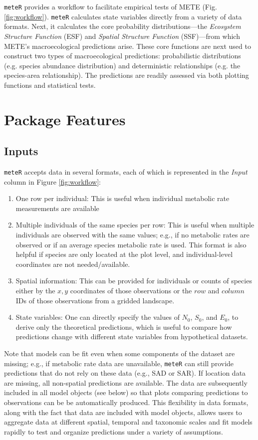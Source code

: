 \texttt{meteR} provides a workflow to facilitate empirical tests of METE
(Fig. \ref{fig:workflow}). \texttt{meteR} calculates state variables
directly from a variety of data formats. Next, it calculates the core
probability distributions---the \textit{Ecosystem Structure Function}
(ESF) and \textit{Spatial Structure Function} (SSF)---from which METE's
macroecological predictions arise. These core functions are next used
to construct two types of macroecological predictions: probabilistic
distributions (e.g. species abundance distribution) and deterministic
relationships (e.g. the species-area relationship). The predictions
are readily assessed via both plotting functions and statistical
tests.

\section{Package Features}

\subsection{Inputs}

\texttt{meteR} accepts data in several formats, each of which is
represented in the \emph{Input} column in Figure \ref{fig:workflow}:
%
\begin{enumerate}
\item One row per individual: This is useful when individual metabolic
  rate measurements are available 
%
\item Multiple individuals of the same species per row: This is useful
  when multiple individuals are observed with the same values; e.g.,
  if no metabolic rates are observed or if an average species
  metabolic rate is used. This format is also helpful if species are
  only located at the plot level, and individual-level coordinates are
  not needed/available.
%
\item Spatial information: This can be provided for individuals or
  counts of species either by the $x, y$ coordinates of those
  observations or the $row$ and $column$ IDs of those observations
  from a gridded landscape.
%
\item State variables: One can directly specify the values of $N_0$,
  $S_0$, and $E_0$, to derive only the theoretical predictions, which
  is useful to compare how predictions change with different state
  variables from hypothetical datasets. 
%
\end{enumerate}

Note that models can be fit even when some components of the dataset
are missing; e.g., if metabolic rate data are unavailable, \texttt{meteR}
can still provide predictions that do not rely on these data (e.g.,
SAD or SAR). If location data are missing, all non-spatial predictions
are available. The data are subsequently included in all model objects
(see below) so that plots comparing predictions to observations can be
be automatically produced. This flexibility in data formats, along
with the fact that data are included with model objects, allows users
to aggregate data at different spatial, temporal and taxonomic scales
and fit models rapidly to test and organize predictions under a
variety of assumptions.

